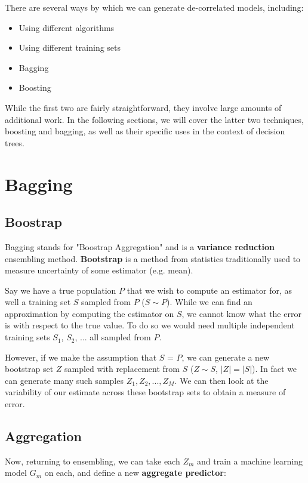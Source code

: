 \documentclass{article}
\begin{document}
There are several ways by which we can generate de-correlated models, including:

\begin{itemize}
	\item Using different algorithms
	\item Using different training sets
	\item Bagging
	\item Boosting
\end{itemize}

While the first two are fairly straightforward, they involve large amounts of additional work.  In the following sections, we will cover the latter two techniques, boosting and bagging, as well as their specific uses in the context of decision trees.

\section{Bagging}

\subsection{Boostrap}

Bagging stands for "Boostrap Aggregation" and is a {\bf variance reduction} ensembling method.  {\bf Bootstrap} is a method from statistics traditionally used to measure uncertainty of some estimator (e.g. mean).  

Say we have a true population $P$ that we wish to compute an estimator for, as well a training set $S$ sampled from $P$ ($S \sim P$).  While we can find an approximation by computing the estimator on $S$, we cannot know what the error is with respect to the true value.  To do so we would need multiple independent training sets $S_1$, $S_2$, ... all sampled from $P$.  

However, if we make the assumption that $S$ = $P$, we can generate a new bootstrap set $Z$ sampled with replacement from $S$ ($Z \sim S$, $|Z| = |S|$).   In fact we can generate many such samples $Z_1, Z_2, ..., Z_M$.  We can then look at the variability of our estimate across these bootstrap sets to obtain a measure of error.

\subsection{Aggregation}

Now, returning to ensembling, we can take each $Z_m$ and train a machine learning model $G_m$ on each, and define a new {\bf aggregate predictor}:
\end{document}
